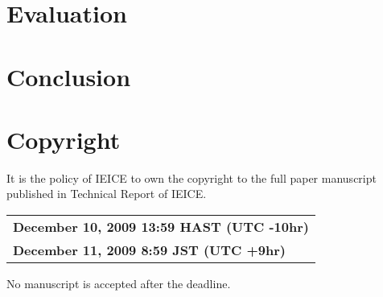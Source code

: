 
\section{Evaluation}




\section{Conclusion}



\section{Copyright}

It is the policy of IEICE to own the copyright to the
full paper manuscript published in Technical Report of
IEICE.


\begin{center}
  \begin{tabular}{l}
    \bf December 10, 2009 13:59 HAST (UTC -10hr) \\
    \bf December 11, 2009 8:59 JST (UTC +9hr)
  \end{tabular}
\end{center}

No manuscript is accepted after the deadline.

